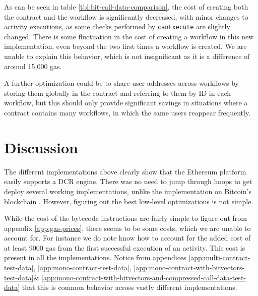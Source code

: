 \documentclass{article}
\begin{document}
		As can be seen in table \ref{tbl:bit-call-data-comparison}, the cost of creating both the contract and the workflow is significantly decreased, with minor changes to activity executions, as some checks performed by \texttt{canExecute} are slightly changed.
		There is some fluctuation in the cost of creating a workflow in this new implementation, even beyond the two first times a workflow is created.
		We are unable to explain this behavior, which is not insignificant as it is a difference of around 15,000 gas.

		A further optimization could be to share user addresses across workflows by storing them globally in the contract and referring to them by ID in each workflow, but this should only provide significant savings in situations where a contract contains many workflows, in which the same users reappear frequently.

	\section{Discussion}
	The different implementations above clearly show that the Ethereum platform easily supports a DCR engine.
	There was no need to jump through hoops to get deploy several working implementations, unlike the implementation on Bitcoin's blockchain \cite{bachelor}.
	However, figuring out the best low-level optimizations is not simple.

	While the cost of the bytecode instructions are fairly simple to figure out from appendix \ref{app:gas-prices}, there seems to be some  costs, which we are unable to account for.
	For instance we do note know how to account for the added cost of at least 9000 gas from the first successful execution of an activity.
	This cost is present in all the implementations.
	Notice from appendices \ref{app:multi-contract-test-data}, \ref{app:mono-contract-test-data}, \ref{app:mono-contract-with-bitvectors-test-data}\& \ref{app:mono-contract-with-bitvectors-and-compressed-call-data-test-data} that this is common behavior across vastly different implementations.
	
\end{document}
